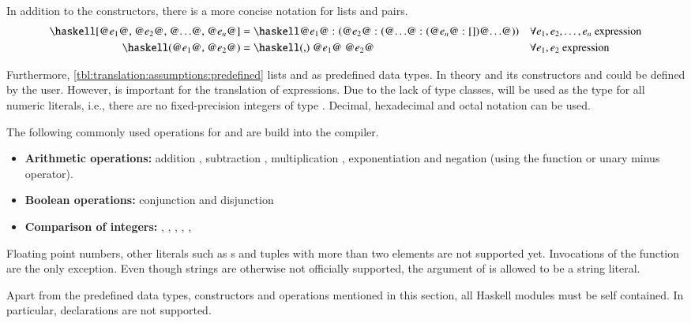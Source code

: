In addition to the constructors, there is a more concise notation for lists and pairs.
\begin{align}
  \haskellM{[@$e_1$@, @$e_2$@, @$\ldots$@, @$e_n$@]}
  &= \haskellM{@$e_1$@ : (@$e_2$@ : (@$\ldots$@ : (@$e_n$@ : [])@$\ldots$@))}
  &&\forall e_1, e_2, \ldots, e_n \text{ expression}
  \label{eqn:translation:assumptions:list-literal}
  \\
  \haskellM{(@$e_1$@, @$e_2$@)}
  &= \haskellM{(,) @$e_1$@ @$e_2$@}
  &&\forall e_1, e_2 \text{ expression}
  \label{eqn:translation:assumptions:pair-literal}
\end{align}

Furthermore, \autoref{tbl:translation:assumptions:predefined} lists  and  as predefined data types.
In theory  and its constructors  and  could be defined by the user.
However,  is important for the translation of  expressions.
Due to the lack of type classes,  will be used as the type for all numeric literals, i.e., there are no fixed-precision integers of type .
Decimal, hexadecimal and octal notation can be used.

The following commonly used operations for  and  are build into the compiler.
\begin{itemize}
  \item \textbf{Arithmetic operations:} addition \haskell{(+)}, subtraction \haskell{(-)}, multiplication \haskell{(*)}, exponentiation \haskell{(^)} and negation (using the  function or unary minus operator).
  \item \textbf{Boolean operations:} conjunction \haskell{(&&)} and disjunction \haskell{(||)}
  \item \textbf{Comparison of integers:} \haskell{(<=)}, \haskell{(<)}, \haskell{(==)}, \haskell{(/=)}, \haskell{(>=)}, \haskell{(>)}
\end{itemize}
Floating point numbers, other literals such as s and tuples with more than two elements are not supported yet.
Invocations of the  function are the only exception.
Even though strings are otherwise not officially supported, the argument of  is allowed to be a string literal.

Apart from the predefined data types, constructors and operations mentioned in this section, all Haskell modules must be self contained.
In particular,  declarations are not supported.

